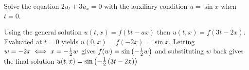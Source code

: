 Solve the equation $2u_t + 3u_x = 0$ with the auxiliary condition $u = \sin x$ when $t = 0$.

\soln* Using the general solution $u(t,x) = f(bt-ax)$ then $u(t,x) = f(3t-2x)$. Evaluated at $t =0$ yields $u(0,x) = f(-2x) = \sin x$. Letting $w = -2x \iff x = -\over{2}w$ gives $f(w) = \sin \pars{-\over{2}w}$ and substituting $w$ back gives the final solution $u(t,x) =  \sin \pars{-\over{2}\pars{3t-2x}}$ 